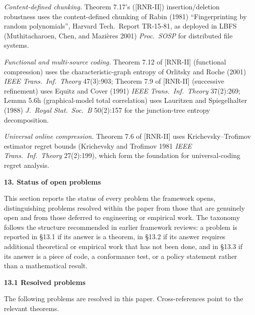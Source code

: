 \documentclass[
]{article}
\begin{document}
\emph{Content-defined chunking.} Theorem 7.17's ([RNR-II]) insertion/deletion
robustness uses the content-defined chunking of Rabin (1981)
``Fingerprinting by random polynomials'', Harvard Tech.\ Report
TR-15-81, as deployed in LBFS (Muthitacharoen, Chen, and Mazi\`eres
2001) \emph{Proc.\ SOSP} for distributed file systems.

\emph{Functional and multi-source coding.} Theorem 7.12 of [RNR-II] (functional
compression) uses the characteristic-graph entropy of Orlitsky and
Roche (2001) \emph{IEEE Trans.\ Inf.\ Theory} 47(3):903; Theorem 7.9 of [RNR-II]
(successive refinement) uses Equitz and Cover (1991) \emph{IEEE
Trans.\ Inf.\ Theory} 37(2):269; Lemma 5.6h (graphical-model total
correlation) uses Lauritzen and Spiegelhalter (1988) \emph{J.\ Royal
Stat.\ Soc.\ B} 50(2):157 for the junction-tree entropy
decomposition.

\emph{Universal online compression.} Theorem 7.6 of [RNR-II] uses
Krichevsky--Trofimov estimator regret bounds (Krichevsky and
Trofimov 1981 \emph{IEEE Trans.\ Inf.\ Theory} 27(2):199), which
form the foundation for universal-coding regret analysis.

\textbf{13. Status of open problems}

This section reports the status of every problem the framework opens,
distinguishing problems resolved within the paper from those that are
genuinely open and from those deferred to engineering or empirical work.
The taxonomy follows the structure recommended in earlier framework
reviews: a problem is reported in §13.1 if its answer is a theorem, in
§13.2 if its answer requires additional theoretical or empirical work
that has not been done, and in §13.3 if its answer is a piece of code, a
conformance test, or a policy statement rather than a mathematical
result.

\textbf{13.1 Resolved problems}

The following problems are resolved in this paper. Cross-references
point to the relevant theorems.
\end{document}
